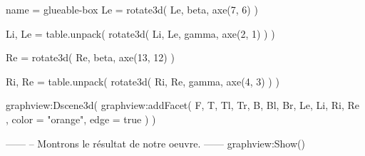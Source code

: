 \documentclass[border = 3pt]{standalone}
\begin{document}
\begin{luadraw*}{name = glueable-box}
Le = rotate3d(
  Le,
  beta, axe(7, 6)
)

Li, Le = table.unpack(
  rotate3d(
    {Li, Le},
    gamma, axe(2, 1)
  )
)

Re = rotate3d(
  Re,
  beta, axe(13, 12)
)

Ri, Re = table.unpack(
  rotate3d(
    {Ri, Re},
    gamma, axe(4, 3)
  )
)

graphview:Dscene3d(
  graphview:addFacet(
    {
      F,
      T, Tl, Tr,
      B, Bl, Br,
      Le, Li,
      Ri, Re
    },
    {
      color = "orange",
      edge  = true
    }
  )
)

------
-- Montrons le résultat de notre oeuvre.
------
graphview:Show()
\end{luadraw*}
\end{document}

